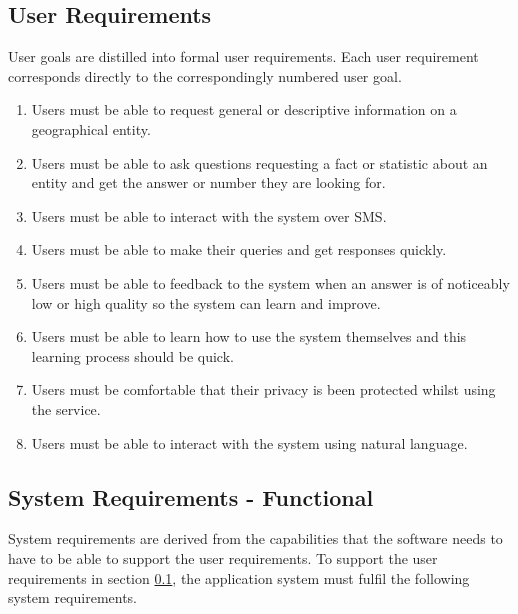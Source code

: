 \documentclass[authoryearcitations]{UoYCSproject}
\begin{document}
\subsection{User Requirements}
\label{subsubsec:userRequirements}
User goals are distilled into formal user requirements.  Each user requirement corresponds directly to the correspondingly numbered user goal.
\begin{enumerate}
  \item Users must be able to request general or descriptive information on a geographical entity.
  \item \label{requirement:getFact} Users must be able to ask questions requesting a fact or statistic about an entity and get the answer or number they are looking for.
  \item Users must be able to interact with the system over SMS.
  \item Users must be able to make their queries and get responses quickly.
  \item Users must be able to feedback to the system when an answer is of noticeably low or high quality so the system can learn and improve.
  \item Users must be able to learn how to use the system themselves and this learning process should be quick.
  \item Users must be comfortable that their privacy is been protected whilst using the service.
  \item \label{requirement:userReqNaturalLanguage} Users must be able to interact with the system using natural language.
\end{enumerate}

\subsection{System Requirements - Functional}
\label{subsubsec:systemRequirementsFunctional}

System requirements are derived from the capabilities that the software needs to have to be able to support the user requirements. To support the user requirements in section \ref{subsubsec:userRequirements}, the application system must fulfil the following system requirements.
\end{document}
